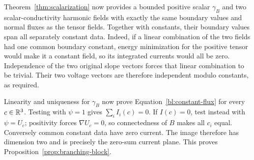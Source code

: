 Theorem~\ref{thm:scalarization} now provides a bounded positive scalar
$\gamma_B$ and two scalar-conductivity harmonic fields with exactly
the same boundary values and normal fluxes as the tensor fields.
Together with constants, their boundary values span all separately
constant data.  Indeed, if a linear combination of the two fields had
one common boundary constant, energy minimization for the positive
tensor would make it a constant field, so its integrated currents
would all be zero.  Independence of the two original slope vectors
forces that linear combination to be trivial.  Their two voltage
vectors are therefore independent modulo constants, as required.

Linearity and uniqueness for $\gamma_B$ now prove
Equation~\eqref{bl:constant-flux} for every $c\in\mathbb R^3$.  Testing with
$\psi=1$ gives $\sum_iI_i(c)=0$.  If $I(c)=0$, test instead with
$\psi=U_c$; positivity forces $\nabla U_c=0$, so connectedness of
$B$ makes all $c_i$ equal.  Conversely common constant data have zero
current.  The image therefore has dimension two and is precisely the
zero-sum current plane.  This proves Proposition~\ref{prop:branching-block}.
